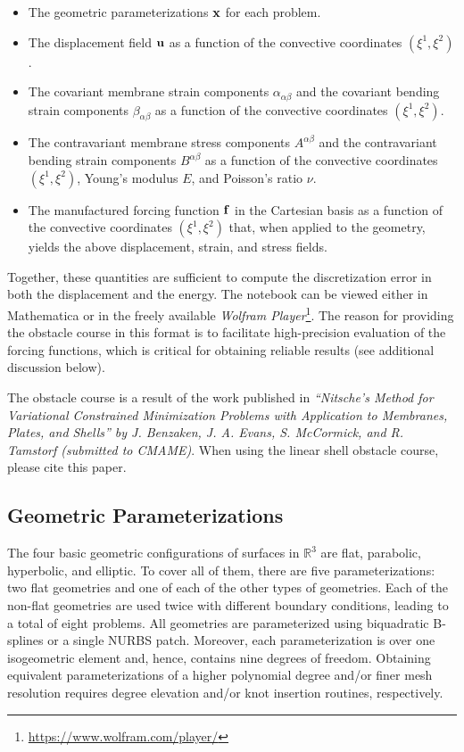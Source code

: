 \documentclass[10pt]{article}
\newcommand{\Real}[0]{\mathbb{R}}
\numberwithin{equation}{section}
\begin{document}
\begin{itemize}
  \item The geometric parameterizations ${\bf x}$ for each problem.
  \item The displacement field ${\bf u}$ as a function of the convective coordinates $(\xi^1,\xi^2)$.
  \item The covariant membrane strain components $\alpha_{\alpha\beta}$ and the covariant bending strain components $\beta_{\alpha\beta}$ as a function of the convective coordinates $(\xi^1,\xi^2)$.
  \item The contravariant membrane stress components $A^{\alpha\beta}$ and the contravariant bending strain components $B^{\alpha\beta}$ as a function of the convective coordinates $(\xi^1,\xi^2)$, Young's modulus $E$, and Poisson's ratio $\nu$.
  \item The manufactured forcing function ${\bf f}$ in the Cartesian basis as a function of the convective coordinates $(\xi^1,\xi^2)$ that, when applied to the geometry, yields the above displacement, strain, and stress fields.
\end{itemize}

Together, these quantities are sufficient to compute the discretization error in both the displacement and the energy. The notebook can be viewed either in Mathematica or in the freely available \emph{Wolfram Player}\footnote{\url{https://www.wolfram.com/player/}}. The reason for providing the obstacle course in this format is to facilitate high-precision evaluation of the forcing functions, which is critical for obtaining reliable results (see additional discussion below).

The obstacle course is a result of the work published in \emph{``Nitsche’s Method for Variational Constrained Minimization Problems with Application to Membranes, Plates, and Shells'' by J. Benzaken, J. A. Evans, S. McCormick, and R. Tamstorf (submitted to CMAME)}. When using the linear shell obstacle course, please cite this paper.

\subsection*{Geometric Parameterizations}

The four basic geometric configurations of surfaces in $\Real^3$ are flat, parabolic, hyperbolic, and elliptic. To cover all of them, there are five parameterizations: two flat geometries and one of each of the other types of geometries. Each of the non-flat geometries are used twice with different boundary conditions, leading to a total of eight problems. All geometries are parameterized using biquadratic B-splines or a single NURBS patch. Moreover, each parameterization is over one isogeometric element and, hence, contains nine degrees of freedom. Obtaining equivalent parameterizations of a higher polynomial degree and/or finer mesh resolution requires degree elevation and/or knot insertion routines, respectively.
\end{document}
